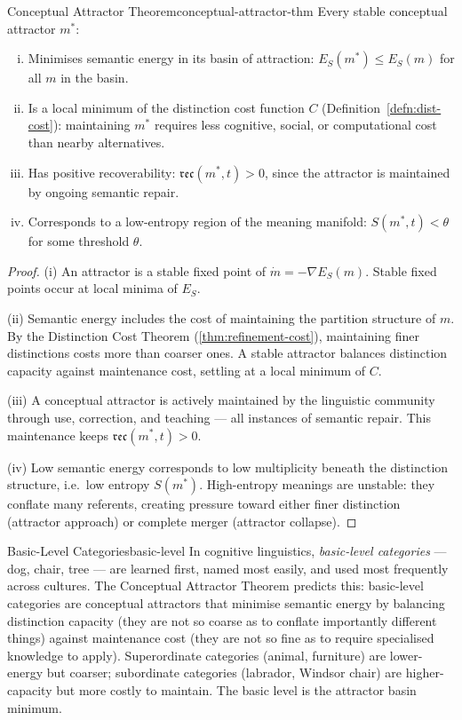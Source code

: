 \documentclass[12pt,twoside,openright]{book}
\newcommand{\csicon} {\marginpar{\tiny\color{DistBlue}\faCode}}
\newcommand{\bioicon}{\marginpar{\tiny\color{DistTeal}\faDna}}
\newcommand{\reco}{\mathfrak{rec}}
\begin{document}
\begin{theorem}{Conceptual Attractor Theorem}{conceptual-attractor-thm}
  Every stable conceptual attractor $m^*$:
  \begin{enumerate}[(i)]
    \item Minimises semantic energy in its basin of
          attraction:
          $E_S(m^*) \le E_S(m)$ for all $m$ in the basin.
    \item Is a local minimum of the distinction cost
          function $C$ (Definition~\ref{defn:dist-cost}):
          maintaining $m^*$ requires less cognitive,
          social, or computational cost than nearby
          alternatives.
    \item Has positive recoverability:
          $\reco(m^*, t) > 0$, since the attractor
          is maintained by ongoing semantic repair.
    \item Corresponds to a low-entropy region of the
          meaning manifold: $S(m^*, t) < \theta$
          for some threshold $\theta$.
  \end{enumerate}
\end{theorem}

\begin{proof}
  (i) An attractor is a stable fixed point of
  $\dot{m} = -\nabla E_S(m)$.
  Stable fixed points occur at local minima of $E_S$.

  (ii) Semantic energy includes the cost of maintaining
  the partition structure of $m$.
  By the Distinction Cost Theorem
  (\cref{thm:refinement-cost}), maintaining finer
  distinctions costs more than coarser ones.
  A stable attractor balances distinction capacity
  against maintenance cost, settling at a local
  minimum of $C$.

  (iii) A conceptual attractor is actively maintained
  by the linguistic community through use, correction,
  and teaching — all instances of semantic repair.
  This maintenance keeps $\reco(m^*, t) > 0$.

  (iv) Low semantic energy corresponds to low
  multiplicity beneath the distinction structure,
  i.e.\ low entropy $S(m^*)$.
  High-entropy meanings are unstable: they conflate
  many referents, creating pressure toward either
  finer distinction (attractor approach) or complete
  merger (attractor collapse).
\end{proof}

\begin{example}{Basic-Level Categories}{basic-level}
  \bioicon\csicon
  In cognitive linguistics, \emph{basic-level categories}
  — dog, chair, tree — are learned first, named most
  easily, and used most frequently across cultures.
  The Conceptual Attractor Theorem predicts this:
  basic-level categories are conceptual attractors that
  minimise semantic energy by balancing distinction
  capacity (they are not so coarse as to conflate
  importantly different things) against maintenance
  cost (they are not so fine as to require specialised
  knowledge to apply).
  Superordinate categories (animal, furniture) are
  lower-energy but coarser;
  subordinate categories (labrador, Windsor chair)
  are higher-capacity but more costly to maintain.
  The basic level is the attractor basin minimum.
\end{example}
\end{document}
